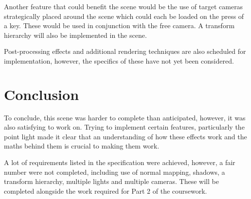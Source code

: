\documentclass[10pt, a4paper]{article}
\begin{document}
 	Another feature that could benefit the scene would be the use of target cameras strategically placed around the scene which could each be loaded on the press of a key. These would be used in conjunction with the free camera. A transform hierarchy will also be implemented in the scene.
 	
 	Post-processing effects and additional rendering techniques are also scheduled for implementation, however, the specifics of these have not yet been considered.
 	
 	\section{Conclusion}
 	To conclude, this scene was harder to complete than anticipated, however, it was also satisfying to work on. Trying to implement certain features, particularly the point light made it clear that an understanding of how these effects work and the maths behind them is crucial to making them work.
 	
 	A lot of requirements listed in the specification were achieved, however, a fair number were not completed, including use of normal mapping, shadows, a transform hierarchy, multiple lights and multiple cameras. These will be completed alongside the work required for Part 2 of the coursework.
 	\pagebreak
	
	
		
\end{document}
